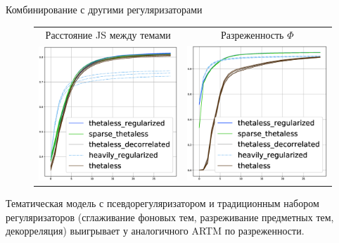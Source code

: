 \begin{frame}{Комбинирование с другими регуляризаторами}

\begin{figure}[t]
\setlength\tabcolsep{0pt} %
\begin{tabular}{cc}
Расстояние JS между темами & Разреженность $\Phi$\\
\includegraphics[width=54mm]{images/CH4_improved_diversity_jensenshannon_False.eps} &
\includegraphics[width=54mm]{images/CH4_improved_SparsityPhiScore.eps} \end{tabular}
\end{figure}

Тематическая модель с псевдорегуляризатором и традиционным набором регуляризаторов (сглаживание фоновых тем, разреживание предметных тем, декорреляция) выигрывает у аналогичного ARTM по разреженности.

\end{frame}


